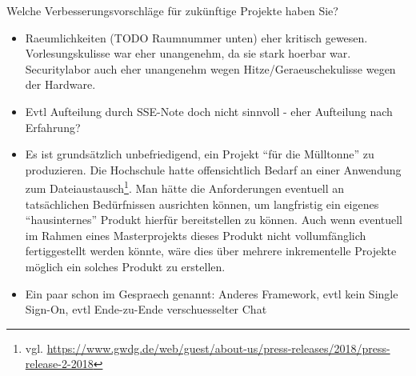 \documentclass[12pt,DIV14,BCOR10mm,a4paper,parskip=half-,headsepline,headinclude,english,ngerman,bibliography=totocnumbered]{scrreprt}
\begin{document}
Welche Verbesserungsvorschläge für zukünftige Projekte haben Sie?

\begin{itemize}
  \item Raeumlichkeiten (TODO Raumnummer unten) eher kritisch gewesen. Vorlesungskulisse war eher unangenehm, da sie stark hoerbar war. Securitylabor auch eher unangenehm wegen Hitze/Geraeuschekulisse wegen der Hardware.
  \item Evtl Aufteilung durch SSE-Note doch nicht sinnvoll - eher Aufteilung nach Erfahrung?
  \item Es ist grundsätzlich unbefriedigend, ein Projekt \enquote{für die Mülltonne} zu produzieren. Die Hochschule hatte offensichtlich Bedarf an einer Anwendung zum Dateiaustausch\footnote{vgl. \url{https://www.gwdg.de/web/guest/about-us/press-releases/2018/press-release-2-2018}}. Man hätte die Anforderungen eventuell an tatsächlichen Bedürfnissen ausrichten können, um langfristig ein eigenes \enquote{hausinternes} Produkt hierfür bereitstellen zu können. Auch wenn eventuell im Rahmen eines Masterprojekts dieses Produkt nicht vollumfänglich fertiggestellt werden könnte, wäre dies über mehrere inkrementelle Projekte möglich ein solches Produkt zu erstellen.
  \item Ein paar schon im Gespraech genannt: Anderes Framework, evtl kein Single Sign-On, evtl Ende-zu-Ende verschuesselter Chat
\end{itemize}

\printbibliography

\printacronyms[title=Abkürzungsverzeichnis,toctitle=Abkürzungsverzeichnis]
\printglossary[title=Glossar,toctitle=Glossar,type=main]

\iftotalfigures
  \listoffigures
\fi


\begin{appendices}

\end{appendices}
\end{document}
